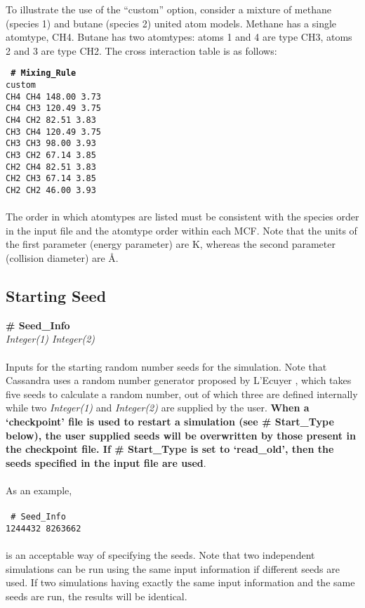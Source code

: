 To illustrate the use of the ``custom'' option, consider a mixture of methane (species 1) and butane (species 2) united atom
models. Methane has a single atomtype, CH4. Butane has two atomtypes: atoms 1 and 4 are type CH3, atoms 2 and 3 are type CH2.
The cross interaction table is as follows:

\texttt{
{\bf \# Mixing\_Rule} \\
custom\\
CH4  CH4  148.00   3.73\\
CH4  CH3  120.49   3.75\\
CH4  CH2   82.51   3.83\\
CH3  CH4  120.49   3.75\\
CH3  CH3   98.00   3.93\\
CH3  CH2   67.14   3.85\\
CH2  CH4   82.51   3.83\\
CH2  CH3   67.14   3.85\\
CH2  CH2   46.00   3.93
}
\\ \\
The order in which atomtypes are listed must be consistent with the species order in the input file and the atomtype order within each MCF.
Note that the units of the first parameter (energy parameter) are K, whereas the second parameter (collision diameter) are \AA.

%
%
\subsection{Starting Seed}\label{sec:Seed_Info}
{\bf \# Seed\_Info} \\ 
{\it Integer(1) Integer(2)} \\ \\
%
Inputs for the starting random number seeds for the simulation. Note
that Cassandra uses a random  number generator proposed by L'Ecuyer
\cite{random_gen:1999}, which takes five  
seeds to calculate a random number, out of which three are 
defined internally while two {\it Integer(1)} and {\it Integer(2)} are
supplied by the user. {\bf When a `checkpoint' file is used to restart a
simulation (see \# Start\_Type below), the user supplied seeds will be
overwritten by those present in the checkpoint file. If \# Start\_Type
is set to `read\_old', then the seeds specified in the input file are
used}.  \\ \\
As an example, \\ \\ 
\texttt{
\# Seed\_Info \\
1244432 8263662
} \\ \\
is an acceptable way of specifying the seeds. Note that two independent
simulations can be run using the same input information if different
seeds are used. If two simulations having exactly the same input
information and the same seeds are run, the results will be
identical. 
%
%
%
